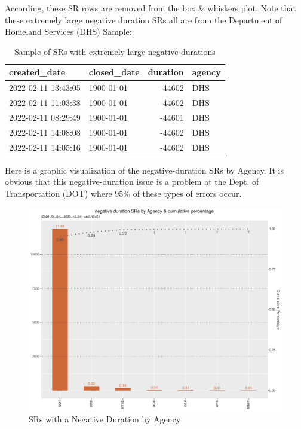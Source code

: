 \documentclass[12pt, titlepage]{article}
\begin{document}
{According, these  SR rows are removed from the box \& whiskers plot. Note that these extremely large negative duration SRs all
are from the Department of Homeland Services (DHS) Sample: 

\begin{table}[H]
    \centering
    \small
    \begin{tabular}{l l r l}
        \toprule
        \textbf{created\_date} & \textbf{closed\_date} & \textbf{duration} & \textbf{agency} \\
	        \midrule
	        2022-02-11 13:43:05 & 1900-01-01 & -44602 & DHS \\
	        2022-02-11 11:03:38 & 1900-01-01 & -44602 & DHS \\
	        2022-02-11 08:29:49 & 1900-01-01 & -44601 & DHS \\
	        2022-02-11 14:08:08 & 1900-01-01 & -44602 & DHS \\
	        2022-02-11 14:05:16 & 1900-01-01 & -44602 & DHS \\
	        \bottomrule
    \end{tabular}
    \caption{Sample of SRs with extremely large negative durations}
    \label{tab:extreme_negative_durations}
\end{table}

Here is a graphic visualization of the negative-duration SRs by Agency. It is obvious that this
negative-duration issue is a problem at the Dept. of Transportation (DOT) where 95\% of these
types of errors occur. 

\begin{figure}[H]
 	 \centering
	  \includegraphics[width = \textwidth]{negative_duration_SR_barchart.pdf}
	  \caption{SRs with a Negative Duration by Agency}
	  \label{fig:negative-duration}
\end{figure}

}
\end{document}
